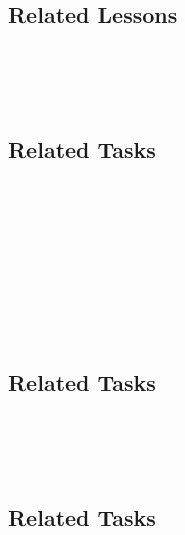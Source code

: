 \subsection{Related Lessons}
\fourFKFourteen{}\\
\fourFKFifteen{}\\
\fourFKSixteen{}\\
%
\subsection{Related Tasks}
\fourFKTen{}\\
\fourFKThirteen{}\\
\fourFKFifteen{}\\
\fourFKSixteen{}\\
\fourFKSeventeen{}\\
\fourFKTwentyFour{}\\
\fourFKTwentySix{}\\
\fourFKThirtyFive{}\\
%
\subsection{Related Tasks}
\fourFKFifteen{}\\
\fourFKThirtyOne{}\\
\fourFKThirtyThree{}\\
%
\subsection{Related Tasks}
\fourgTwo{}\\
\fourgFive{}\\
\fourFKSeven{}\\
\fourFKThirteen{}\\
\fourFKFourteen{}\\
\fourFKFifteen{}\\
\fourFKSixteen{}
